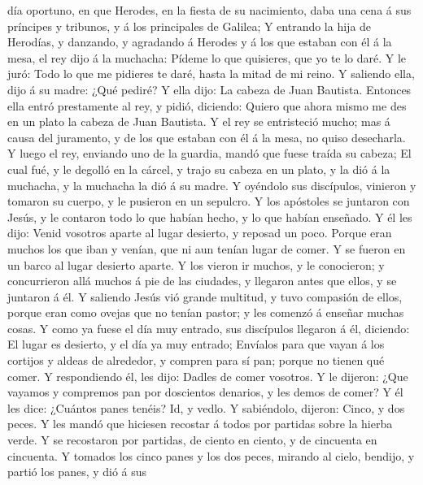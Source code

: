 día oportuno, en que Herodes, en la fiesta de su nacimiento, daba una
cena á sus príncipes y tribunos, y á los principales de Galilea;
 Y entrando la hija de Herodías, y danzando, y agradando á
Herodes y á los que estaban con él á la mesa, el rey dijo á la muchacha:
Pídeme lo que quisieres, que yo te lo daré.  Y le juró:
Todo lo que me pidieres te daré, hasta la mitad de mi reino.
 Y saliendo ella, dijo á su madre: ¿Qué pediré? Y ella
dijo: La cabeza de Juan Bautista.  Entonces ella entró
prestamente al rey, y pidió, diciendo: Quiero que ahora mismo me des en
un plato la cabeza de Juan Bautista.  Y el rey se
entristeció mucho; mas á causa del juramento, y de los que estaban con
él á la mesa, no quiso desecharla.  Y luego el rey,
enviando uno de la guardia, mandó que fuese traída su cabeza;
 El cual fué, y le degolló en la cárcel, y trajo su cabeza
en un plato, y la dió á la muchacha, y la muchacha la dió á su madre.
 Y oyéndolo sus discípulos, vinieron y tomaron su cuerpo, y
le pusieron en un sepulcro.  Y los apóstoles se juntaron
con Jesús, y le contaron todo lo que habían hecho, y lo que habían
enseñado.  Y él les dijo: Venid vosotros aparte al lugar
desierto, y reposad un poco. Porque eran muchos los que iban y venían,
que ni aun tenían lugar de comer.  Y se fueron en un barco
al lugar desierto aparte.  Y los vieron ir muchos, y le
conocieron; y concurrieron allá muchos á pie de las ciudades, y llegaron
antes que ellos, y se juntaron á él.  Y saliendo Jesús vió
grande multitud, y tuvo compasión de ellos, porque eran como ovejas que
no tenían pastor; y les comenzó á enseñar muchas cosas.  Y
como ya fuese el día muy entrado, sus discípulos llegaron á él,
diciendo: El lugar es desierto, y el día ya muy entrado; 
Envíalos para que vayan á los cortijos y aldeas de alrededor, y compren
para sí pan; porque no tienen qué comer.  Y respondiendo
él, les dijo: Dadles de comer vosotros. Y le dijeron: ¿Que vayamos y
compremos pan por doscientos denarios, y les demos de comer?
 Y él les dice: ¿Cuántos panes tenéis? Id, y vedlo. Y
sabiéndolo, dijeron: Cinco, y dos peces.  Y les mandó que
hiciesen recostar á todos por partidas sobre la hierba verde.
 Y se recostaron por partidas, de ciento en ciento, y de
cincuenta en cincuenta.  Y tomados los cinco panes y los
dos peces, mirando al cielo, bendijo, y partió los panes, y dió á sus

